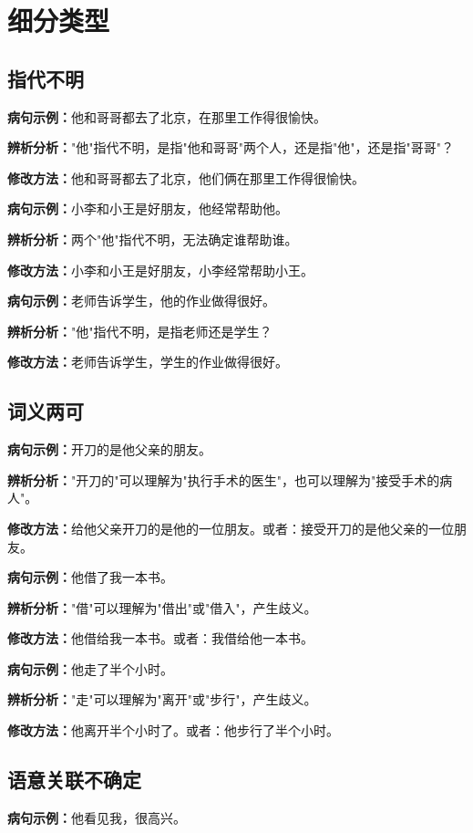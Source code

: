 \documentclass[a4paper,12pt]{ctexrep}
\newcommand{\exampleicon}{\textcolor{highlight}{\faExclamationTriangle}}
\newcommand{\analysisicon}{\textcolor{accent}{\faSearch}}
\newcommand{\revisionicon}{\textcolor{secondary}{\faCheckCircle}}
\begin{document}
\section{细分类型}
\subsection{指代不明}
\exampleicon \textbf{病句示例：}他和哥哥都去了北京，在那里工作得很愉快。

\analysisicon \textbf{辨析分析：}"他"指代不明，是指"他和哥哥"两个人，还是指"他"，还是指"哥哥"？

\revisionicon \textbf{修改方法：}他和哥哥都去了北京，他们俩在那里工作得很愉快。

\exampleicon \textbf{病句示例：}小李和小王是好朋友，他经常帮助他。

\analysisicon \textbf{辨析分析：}两个"他"指代不明，无法确定谁帮助谁。

\revisionicon \textbf{修改方法：}小李和小王是好朋友，小李经常帮助小王。

\exampleicon \textbf{病句示例：}老师告诉学生，他的作业做得很好。

\analysisicon \textbf{辨析分析：}"他"指代不明，是指老师还是学生？

\revisionicon \textbf{修改方法：}老师告诉学生，学生的作业做得很好。

\subsection{词义两可}
\exampleicon \textbf{病句示例：}开刀的是他父亲的朋友。

\analysisicon \textbf{辨析分析：}"开刀的"可以理解为"执行手术的医生"，也可以理解为"接受手术的病人"。

\revisionicon \textbf{修改方法：}给他父亲开刀的是他的一位朋友。或者：接受开刀的是他父亲的一位朋友。

\exampleicon \textbf{病句示例：}他借了我一本书。

\analysisicon \textbf{辨析分析：}"借"可以理解为"借出"或"借入"，产生歧义。

\revisionicon \textbf{修改方法：}他借给我一本书。或者：我借给他一本书。

\exampleicon \textbf{病句示例：}他走了半个小时。

\analysisicon \textbf{辨析分析：}"走"可以理解为"离开"或"步行"，产生歧义。

\revisionicon \textbf{修改方法：}他离开半个小时了。或者：他步行了半个小时。

\subsection{语意关联不确定}
\exampleicon \textbf{病句示例：}他看见我，很高兴。
\end{document}
